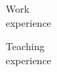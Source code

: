 \documentclass{resume}
\begin{document}

\begin{category}{Work \\experience}


\end{category}


\begin{category}{Teaching \\experience}



\end{category}




\end{document}
